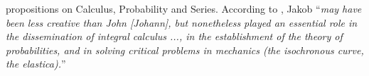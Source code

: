 propositions on Calculus, Probability and Series. According to \cite{maugin_2014}, Jakob ``\emph{may have been less creative than John [Johann], but nonetheless played an essential role in the dissemination of integral calculus ..., in the establishment of the theory of probabilities, and in solving critical problems in mechanics (the isochronous curve, the \emph{elastica}).}''
\begin{figure}[!ht]
	\centering
	\begin{center}
	\end{center}
	\label{fg:JakobPortrai}
\end{figure}  

